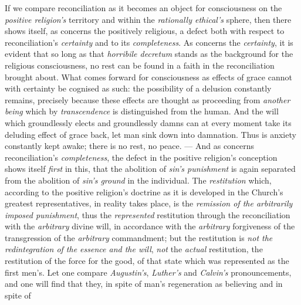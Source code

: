 \documentclass[12pt,a4paper]{book}
\begin{document}
If we compare reconciliation as it becomes an object for consciousness on the
\emph{positive religion's} territory and within the \emph{rationally ethical's}
sphere, then there shows itself, as concerns the positively religious, a defect
both with respect to reconciliation's \emph{certainty} and to its
\emph{completeness}. As concerns the \emph{certainty}, it is evident that so
long as that \textit{horribile decretum} stands as the background for the
religious consciousness, no rest can be found in a faith in the reconciliation
brought about. What comes forward for consciousness as effects of grace cannot
with certainty be cognised as such: the possibility of a delusion constantly
remains, precisely because these effects are thought as proceeding from
\emph{another being} which by \emph{transcendence} is distinguished from the
human. And the will which groundlessly elects and groundlessly damns can at
every moment take its deluding effect of grace back, let man sink down into
damnation. Thus is anxiety constantly kept awake; there is no rest, no peace.
--- And as concerns reconciliation's \emph{completeness}, the defect in the
positive religion's conception shows itself \emph{first} in this, that the
abolition of \emph{sin's punishment} is again separated from the abolition of
\emph{sin's ground} in the individual. The
\emph{restitution} which, according to the positive religion's doctrine as it is
developed in the Church's greatest representatives, in reality takes place, is
the \emph{remission of the arbitrarily imposed punishment}, thus the
\emph{represented} restitution through the reconciliation with the
\emph{arbitrary} divine will, in accordance with the \emph{arbitrary}
forgiveness of the transgression of the \emph{arbitrary} commandment; but the
restitution is \emph{not the redintegration of the essence and the will},
\emph{not} the \emph{actual} restitution, the restitution of the force for the
good, of that state which was represented as the first men's. Let one compare
\emph{Augustin's}, \emph{Luther's} and \emph{Calvin's} pronouncements, and one
will find that they, in spite of man's regeneration as believing and in spite of
\end{document}
